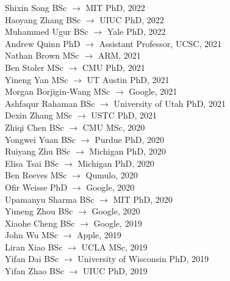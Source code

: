 \documentclass[10pt]{article}
\newcommand{\myssub}[1]{\hspace*{2mm}\parbox{163mm}{#1}\vspace*{2mm}}
\begin{document}
Shixin Song \hfill BSc $\rightarrow$ MIT PhD, 2022\\
Haoyang Zhang \hfill BSc $\rightarrow$ UIUC PhD, 2022\\
Muhammed Ugur \hfill BSc $\rightarrow$ Yale PhD, 2022\\
Andrew Quinn \hfill PhD $\rightarrow$ Assistant Professor, UCSC, 2021  \\
Nathan Brown \hfill MSc $\rightarrow$ ARM, 2021 \\
Ben Stoler \hfill MSc $\rightarrow$ CMU PhD, 2021 \\
Yineng Yan \hfill MSc $\rightarrow$ UT Austin PhD, 2021 \\
Morgan Borjigin-Wang \hfill MSc $\rightarrow$ Google, 2021 \\
Ashfaqur Rahaman \hfill BSc $\rightarrow$ University of Utah PhD, 2021\\
Dexin Zhang \hfill MSc $\rightarrow$ USTC PhD, 2021 \\
Zhiqi Chen \hfill BSc $\rightarrow$ CMU MSc, 2020 \\
Yongwei Yuan \hfill BSc $\rightarrow$ Purdue PhD, 2020 \\
Ruiyang Zhu \hfill BSc $\rightarrow$ Michigan PhD, 2020 \\
Elisa Tsai \hfill BSc $\rightarrow$ Michigan PhD, 2020 \\
Ben Reeves \hfill MSc $\rightarrow$ Qumulo, 2020 \\
Ofir Weisse \hfill PhD $\rightarrow$ Google, 2020 \\
Upamanyu Sharma \hfill BSc $\rightarrow$ MIT PhD, 2020 \\
Yimeng Zhou \hfill BSc $\rightarrow$ Google, 2020 \\
Xiaohe Cheng \hfill BSc $\rightarrow$ Google, 2019 \\
John Wu \hfill MSc $\rightarrow$ Apple, 2019\\
Liran Xiao \hfill BSc $\rightarrow$ UCLA MSc, 2019 \\
Yifan Dai \hfill BSc $\rightarrow$ University of Wisconsin PhD, 2019 \\
Yifan Zhao \hfill BSc $\rightarrow$ UIUC PhD, 2019 \\

\end{document}
